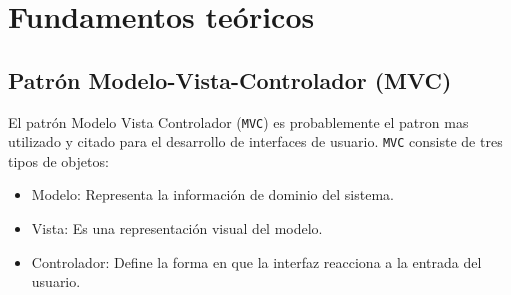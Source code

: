 \chapter{Fundamentos teóricos}

\section{Patrón Modelo-Vista-Controlador (MVC)}
El patrón Modelo Vista Controlador (\texttt{MVC}) es probablemente el patron mas utilizado y citado para el desarrollo de interfaces de usuario. \texttt{MVC} consiste de tres tipos de objetos:

\begin{itemize}
\item Modelo: Representa la información de dominio del sistema.
\item Vista: Es una representación visual del modelo.
\item Controlador: Define la forma en que la interfaz reacciona a la entrada
  del usuario.
\end{itemize}
